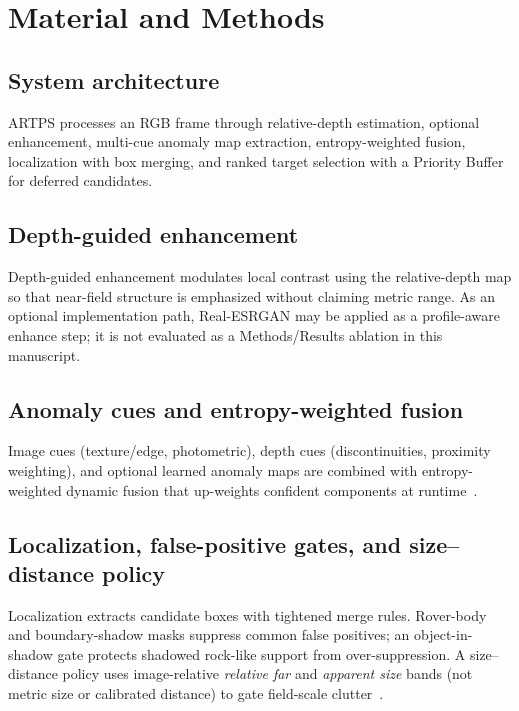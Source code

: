 \documentclass[10pt,twocolumn,letterpaper]{article}
\begin{document}
\section{Material and Methods}
\subsection{System architecture}
ARTPS processes an RGB frame through relative-depth estimation, optional enhancement,
multi-cue anomaly map extraction, entropy-weighted fusion, localization with box merging,
and ranked target selection with a Priority Buffer for deferred candidates.

\subsection{Depth-guided enhancement}
Depth-guided enhancement modulates local contrast using the relative-depth map so that
near-field structure is emphasized without claiming metric range.
As an optional implementation path, Real-ESRGAN may be applied as a profile-aware enhance
step; it is not evaluated as a Methods/Results ablation in this manuscript.

\subsection{Anomaly cues and entropy-weighted fusion}
Image cues (texture/edge, photometric), depth cues (discontinuities, proximity weighting),
and optional learned anomaly maps are combined with entropy-weighted dynamic fusion that
up-weights confident components at runtime~\citep{defard2020padim,roth2022patchcore}.

\subsection{Localization, false-positive gates, and size--distance policy}
Localization extracts candidate boxes with tightened merge rules.
Rover-body and boundary-shadow masks suppress common false positives; an object-in-shadow
gate protects shadowed rock-like support from over-suppression.
A size--distance policy uses image-relative \emph{relative far} and \emph{apparent size}
bands (not metric size or calibrated distance) to gate field-scale clutter~\citep{ranftl2021dpt}.
\end{document}
